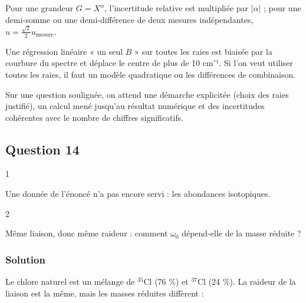 \documentclass[11pt,a4paper]{article}
\begin{document}
\begin{methode}

Pour une grandeur \(G=X^\alpha\), l'incertitude relative est multipliée par \(\lvert\alpha\rvert\) ; pour une demi-somme ou une demi-différence de deux mesures indépendantes, \(u=\frac{\sqrt2}{2}u_{\text{mesure}}\).

\end{methode}

\begin{piege}

Une régression linéaire « un seul \(B\) » sur toutes les raies est biaisée par la courbure du spectre et déplace le centre de plus de 10 cm⁻¹. Si l'on veut utiliser toutes les raies, il faut un modèle quadratique ou les différences de combinaison.

\end{piege}

\begin{jury}

Sur une question soulignée, on attend une démarche explicitée (choix des raies justifié), un calcul mené jusqu'au résultat numérique et des incertitudes cohérentes avec le nombre de chiffres significatifs.

\end{jury}

\hypertarget{question-14}{%
\subsection{Question 14}\label{question-14}}

\begin{indication}{1}

Une donnée de l'énoncé n'a pas encore servi : les abondances isotopiques.

\end{indication}

\begin{indication}{2}

Même liaison, donc même raideur : comment \(\omega_0\) dépend-elle de la masse réduite ?

\end{indication}

\hypertarget{solution-13}{%
\subsubsection{Solution}\label{solution-13}}

Le chlore naturel est un mélange de \(^{35}\)Cl (76 \%) et \(^{37}\)Cl (24 \%). La raideur de la liaison est la même, mais les masses réduites diffèrent :
\end{document}
